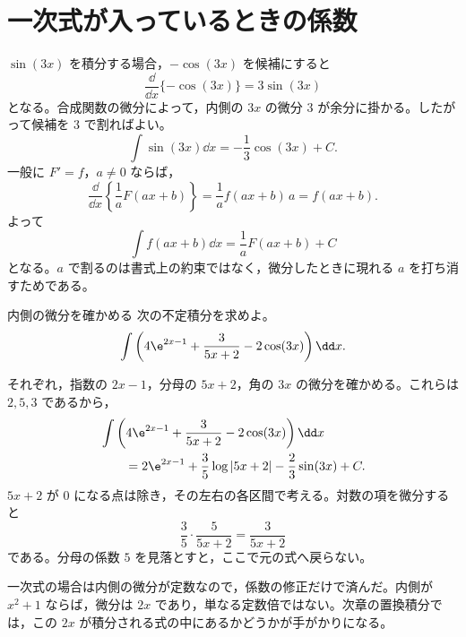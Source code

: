 \section{一次式が入っているときの係数}\label{節:一次式の積分}

$\sin(3x)$ を積分する場合，$-\cos(3x)$ を候補にすると
\[
 \frac{\dd}{\dd x}\{-\cos(3x)\}=3\sin(3x)
\]
となる。合成関数の微分によって，内側の $3x$ の微分 $3$ が余分に掛かる。したがって候補を $3$ で割ればよい。
\[
 \int\sin(3x)\dd x=-\frac13\cos(3x)+C.
\]
一般に $F'=f$，$a\ne0$ ならば，
\[
 \frac{\dd}{\dd x}\left\{\frac1aF(ax+b)\right\}
 =\frac1a f(ax+b)\,a=f(ax+b).
\]
よって
\[
 \int f(ax+b)\dd x=\frac1aF(ax+b)+C
\]
となる。$a$ で割るのは書式上の約束ではなく，微分したときに現れる $a$ を打ち消すためである。

\begin{example}{内側の微分を確かめる}
次の不定積分を求めよ。
\[
 \int\left(4\e^{2x-1}+\frac3{5x+2}-2\cos(3x)\right)\dd x.
\]
\end{example}

それぞれ，指数の $2x-1$，分母の $5x+2$，角の $3x$ の微分を確かめる。これらは $2,5,3$ であるから，
\[
\begin{aligned}
 &\int\left(4\e^{2x-1}+\frac3{5x+2}-2\cos(3x)\right)\dd x\\
 &\qquad=2\e^{2x-1}+\frac35\log|5x+2|
       -\frac23\sin(3x)+C.
\end{aligned}
\]
$5x+2$ が $0$ になる点は除き，その左右の各区間で考える。対数の項を微分すると
\[
 \frac35\cdot\frac5{5x+2}=\frac3{5x+2}
\]
である。分母の係数 $5$ を見落とすと，ここで元の式へ戻らない。

一次式の場合は内側の微分が定数なので，係数の修正だけで済んだ。内側が $x^2+1$ ならば，微分は $2x$ であり，単なる定数倍ではない。次章の置換積分では，この $2x$ が積分される式の中にあるかどうかが手がかりになる。

